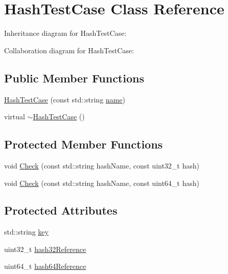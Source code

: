 \hypertarget{classHashTestCase}{}\section{Hash\+Test\+Case Class Reference}
\label{classHashTestCase}


Inheritance diagram for Hash\+Test\+Case\+:


Collaboration diagram for Hash\+Test\+Case\+:
\subsection*{Public Member Functions}
\begin{DoxyCompactItemize}
\item 
\hyperlink{classHashTestCase_afd1d5e137f7e46708e340e3823370b7f}{Hash\+Test\+Case} (const std\+::string \hyperlink{generate__test__data__lte__spectrum__model_8m_ab74e6bf80237ddc4109968cedc58c151}{name})
\item 
virtual \hyperlink{classHashTestCase_a514215b0159edda6bf30a8df344f85f2}{$\sim$\+Hash\+Test\+Case} ()
\end{DoxyCompactItemize}
\subsection*{Protected Member Functions}
\begin{DoxyCompactItemize}
\item 
void \hyperlink{classHashTestCase_a798edd071714c5f3ff76a087622e097c}{Check} (const std\+::string hash\+Name, const uint32\+\_\+t hash)
\item 
void \hyperlink{classHashTestCase_a10568ed2f70f4a32b46feb7bf13743bd}{Check} (const std\+::string hash\+Name, const uint64\+\_\+t hash)
\end{DoxyCompactItemize}
\subsection*{Protected Attributes}
\begin{DoxyCompactItemize}
\item 
std\+::string \hyperlink{classHashTestCase_a955e1a4f01ad2ae6474e52e3bd403069}{key}
\item 
uint32\+\_\+t \hyperlink{classHashTestCase_ae09d132ca1bd82e42b9beedbf98f9b45}{hash32\+Reference}
\item 
uint64\+\_\+t \hyperlink{classHashTestCase_a5e302abe033e775847dcf8856a94fea2}{hash64\+Reference}
\end{DoxyCompactItemize}
